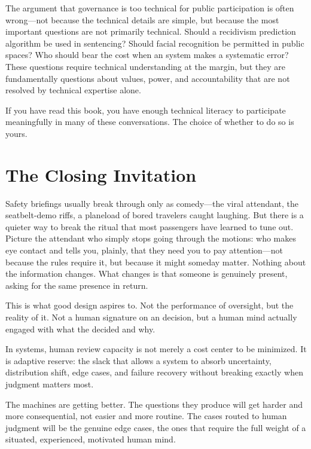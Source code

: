 The argument that \ai governance is too technical for public participation is often wrong---not because the technical details are simple, but because the most important questions are not primarily technical. Should a recidivism prediction algorithm be used in sentencing? Should facial recognition be permitted in public spaces? Who should bear the cost when an \ai system makes a systematic error? These questions require technical understanding at the margin, but they are fundamentally questions about values, power, and accountability that are not resolved by technical expertise alone.

If you have read this book, you have enough technical literacy to participate meaningfully in many of these conversations. The choice of whether to do so is yours.

\section{The Closing Invitation}
\label{sec:ch19-closing}

Safety briefings usually break through only as comedy---the viral attendant, the seatbelt-demo riffs, a planeload of bored travelers caught laughing. But there is a quieter way to break the ritual that most passengers have learned to tune out. Picture the attendant who simply stops going through the motions: who makes eye contact and tells you, plainly, that they need you to pay attention---not because the rules require it, but because it might someday matter. Nothing about the information changes. What changes is that someone is genuinely present, asking for the same presence in return.

This is what good \hitl design aspires to. Not the performance of oversight, but the reality of it. Not a human signature on an \ai decision, but a human mind actually engaged with what the \ai decided and why.

\begin{keyconcept}
In \hitl systems, human review capacity is not merely a cost center to be minimized. It is adaptive reserve: the slack that allows a system to absorb uncertainty, distribution shift, edge cases, and failure recovery without breaking exactly when judgment matters most.
\end{keyconcept}

The machines are getting better. The questions they produce will get harder and more consequential, not easier and more routine. The cases routed to human judgment will be the genuine edge cases, the ones that require the full weight of a situated, experienced, motivated human mind.

